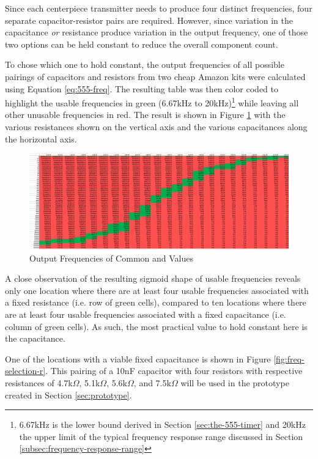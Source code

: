 Since each centerpiece transmitter needs to produce four distinct frequencies, four separate capacitor-resistor pairs are required. 
However, since variation in the capacitance \emph{or} resistance produce variation in the output frequency, one of those two options can be held constant to reduce the overall component count.

To chose which one to hold constant, the output frequencies of all possible pairings of capacitors and resistors from two cheap Amazon kits \cite{amazon-resistors} \cite{amazon-capacitors} were calculated using Equation \ref{eq:555-freq}. 
The resulting table was then color coded to highlight the usable frequencies in green (6.67kHz to 20kHz)\footnote{6.67kHz is the lower bound derived in Section \ref{sec:the-555-timer} and 20kHz the upper limit of the typical frequency response range discussed in Section \ref{subsec:frequency-response-range}} while leaving all other unusable frequencies in red.
The result is shown in Figure \ref{fig:freq-selection} with the various resistances shown on the vertical axis and the various capacitances along the horizontal axis.

\begin{figure}[h]
    \centering
    \caption{Output Frequencies of Common  and  Values}
    \label{fig:freq-selection}
    \includegraphics[width=\linewidth]{Figures/6 PCB Design/freq_selection.png}
\end{figure}

A close observation of the resulting sigmoid shape of usable frequencies reveals only one location where there are at least four usable frequencies associated with a fixed resistance (i.e. row of green cells), compared to ten locations where there are at least four usable frequencies associated with a fixed capacitance (i.e. column of green cells).
As such, the most practical value to hold constant here is the capacitance.

One of the locations with a viable fixed capacitance is shown in Figure \ref{fig:freq-selection-r}. This pairing of a 10nF capacitor with four resistors with respective resistances of 4.7k$\Omega$, 5.1k$\Omega$, 5.6k$\Omega$, and 7.5k$\Omega$ will be used in the prototype created in Section \ref{sec:prototype}. 

